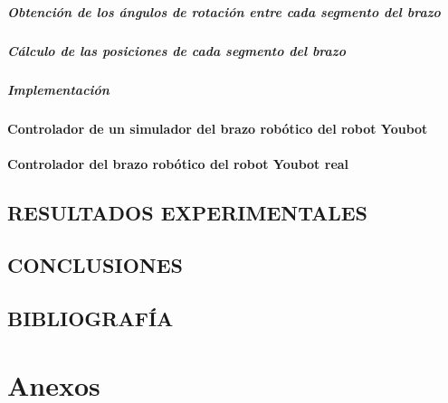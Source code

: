 \documentclass[10pt,a4paper]{report}
\begin{document}
\subsubsection{Obtención de los ángulos de rotación entre cada segmento del brazo}

\subsubsection{Cálculo de las posiciones de cada segmento del brazo}

\subsubsection{Implementación}

\subsection{Controlador de un simulador del brazo robótico del robot Youbot}

\subsection{Controlador del brazo robótico del robot Youbot real}


\chapter{RESULTADOS EXPERIMENTALES}



\chapter{CONCLUSIONES}



\chapter{BIBLIOGRAFÍA}



\part{Anexos}

\appendix
\end{document}
